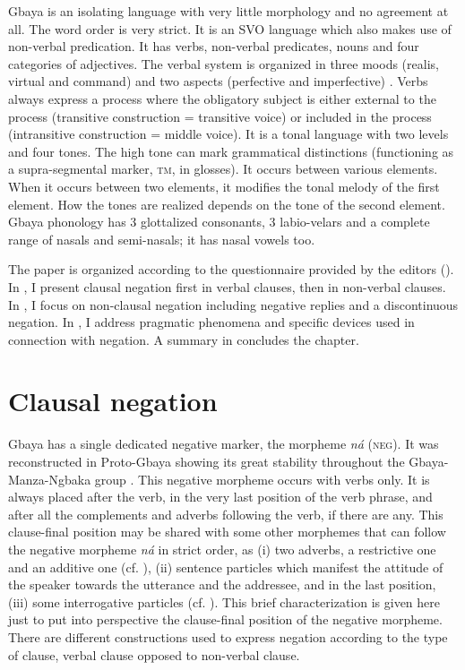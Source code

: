 \documentclass[output=paper,colorlinks=true, citecolor=brown]{langscibook}
\begin{document}
Gbaya is an isolating language with very little morphology and no agreement at all. The word order is very strict. It is an SVO language which also makes use of non-verbal predication. It has verbs, non-verbal predicates, nouns and four categories of adjectives. The verbal system is organized in three moods (realis, virtual and command) and two aspects (perfective and imperfective) \citep[see][]{Roulon1975,Roulon-Doko1993}. Verbs always express a process where the obligatory subject is either external to the process (transitive construction = transitive voice) or included in the process (intransitive construction = middle voice). It is a tonal language with two levels and four tones. The high tone can mark grammatical distinctions (functioning as a supra-segmental marker, \textsc{tm}, in glosses). It occurs between various elements. When it occurs between two elements, it modifies the tonal melody of the first element. How the tones are realized depends on the tone of the second element. Gbaya phonology has 3 glottalized consonants, 3 labio-velars and a complete range of nasals and semi-nasals; it has nasal vowels too.

The paper is organized according to the questionnaire provided by the editors (). In , I present clausal negation first in verbal clauses, then in non-verbal clauses. In , I focus on non-clausal negation including negative replies and a discontinuous negation. In , I address pragmatic phenomena and specific devices used in connection with negation. A summary in   concludes the chapter.

\section{Clausal negation}\label{sec:gba:2}

Gbaya has a single dedicated negative marker, the morpheme \textit{ná} (\textsc{neg}). It was reconstructed in Proto-Gbaya showing its great stability throughout the Gbaya-Manza-Ngbaka group \citep{Monino1995}.
This negative morpheme occurs with verbs only. It is always placed after the verb, in the very last position of the verb phrase, and after all the complements and adverbs following the verb, if there are any. This clause-final position may be shared with some other morphemes that can follow the negative morpheme \textit{ná} in strict order, as (i) two adverbs, a restrictive one and an additive one (cf. ), (ii) sentence particles which manifest the attitude of the speaker towards the utterance and the addressee, and in the last position, (iii) some interrogative particles (cf. ). This brief characterization is given here just to put into perspective the clause-final position of the negative morpheme. There are different constructions used to express negation according to the type of clause, verbal clause opposed to non-verbal clause. 
\end{document}
